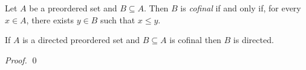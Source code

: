 \begin{definition}[Cofinal]
    Let $A$ be a preordered set and $B \subseteq A$. Then $B$ is \emph{cofinal}
    if and only if, for every $x \in A$, there exists $y \in B$ such that
    $x \leq y$.
\end{definition}

\begin{proposition}
    If $A$ is a directed preordered set and $B \subseteq A$ is cofinal then $B$ is
    directed.
\end{proposition}

\begin{proof}
    \pf
    \qed
\end{proof}
